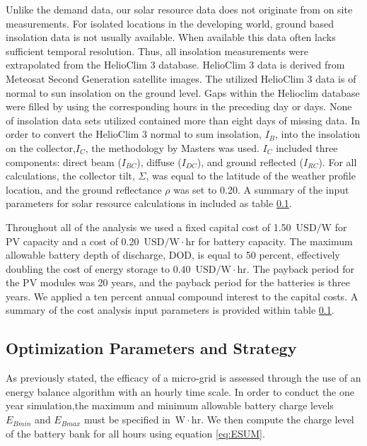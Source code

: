 \documentclass{article}
\newcommand{\unit}[1]{\ensuremath{\, \mathrm{#1}}}
\begin{document}
% 
Unlike the demand data, our solar resource data does not originate from on site measurements.
For isolated locations in the developing world, ground based insolation data is not usually available. 
When available this data often lacks sufficient temporal resolution. 
Thus, all insolation measurements were extrapolated from the HelioClim 3 database.
HelioClim 3 data is derived from Meteosat Second Generation satellite images.
The utilized HelioClim 3 data is of normal to sun insolation on the ground level.
Gaps within the Helioclim database were filled by using the corresponding hours in the preceding day or days.
None of insolation data sets utilized contained more than eight days of missing data.
In order to convert the HelioClim 3 normal to sum insolation, $I_B$, into the insolation on the collector,$I_C$, the methodology by Masters \cite{} was used. 
$I_C$ included three components: direct beam ($I_{BC}$), diffuse ($I_{DC}$), and ground reflected ($I_{RC}$).
For all calculations, the collector tilt, $\Sigma$, was equal to the latitude of the weather profile location, and the ground reflectance $\rho$ was set to 0.20.
A summary of the input parameters for solar resource calculations in included as table \ref{}.

Throughout all of the analysis we used a fixed capital cost of 1.50 \unit{USD/W} for PV capacity and a cost of 0.20 \unit{USD/W \! \cdot \! hr} for battery capacity.
The maximum allowable battery depth of discharge, DOD, is equal to 50 percent, effectively doubling the cost of energy storage to 0.40 \unit{USD/W \! \cdot \! hr}. 
The payback period for the PV modules was 20 years, and the payback period for the batteries is three years. 
We applied a ten percent annual compound interest to the capital costs. 
A summary of the cost analysis input parameters is provided within table \ref{}.

\subsection{Optimization Parameters and Strategy}

As previously stated, the efficacy of a micro-grid is assessed through the use of an energy balance algorithm with an hourly time scale. 
In order to conduct the one year simulation,the maximum and minimum allowable battery charge levels $E_{Bmin}$ and $E_{Bmax}$ must be specified in \unit{W\! \cdot \! hr}.
We then compute the charge level of the battery bank for all hours using equation \ref{eq:ESUM}. 
\end{document}
